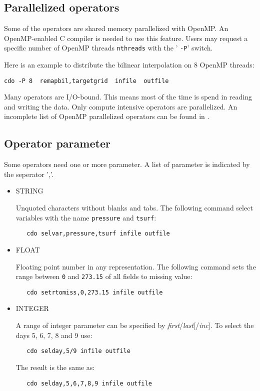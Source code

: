 \subsection{Parallelized operators}

Some of the {\CDO} operators are shared memory parallelized with OpenMP.
An OpenMP-enabled C compiler is needed to use this feature.
Users may request a specific number of OpenMP threads \texttt{nthreads} with the ' \texttt{-P}' switch.

Here is an example to distribute the bilinear interpolation on 8 OpenMP threads:
\begin{lstlisting}[frame=single, backgroundcolor=\color{pcolor2}, basicstyle=\ttfamily, columns=flexible]
   cdo -P 8  remapbil,targetgrid  infile  outfile
\end{lstlisting}

Many {\CDO} operators are I/O-bound. This means most of the time is spend in reading and writing the data. 
Only compute intensive {\CDO} operators are parallelized. 
An incomplete list of OpenMP parallelized operators can be found in .

\subsection{Operator parameter}

Some operators need one or more parameter. A list of parameter is indicated by the seperator ','.

\begin{itemize}
\item STRING

Unquoted characters without blanks and tabs.
The following command select variables with the name \texttt{pressure} and \texttt{tsurf}:
\begin{verbatim}
   cdo selvar,pressure,tsurf infile outfile
\end{verbatim}

\item FLOAT

Floating point number in any representation.
The following command sets the range between \texttt{0} and \texttt{273.15}
of all fields to missing value:
\begin{verbatim}
   cdo setrtomiss,0,273.15 infile outfile
\end{verbatim}

\item INTEGER

A range of integer parameter can be specified by \textit{first}/\textit{last}[/\textit{inc}].
To select the days 5, 6, 7, 8 and 9 use:
\begin{verbatim}
   cdo selday,5/9 infile outfile
\end{verbatim}
The result is the same as:
\begin{verbatim}
   cdo selday,5,6,7,8,9 infile outfile
\end{verbatim}
\end{itemize}

